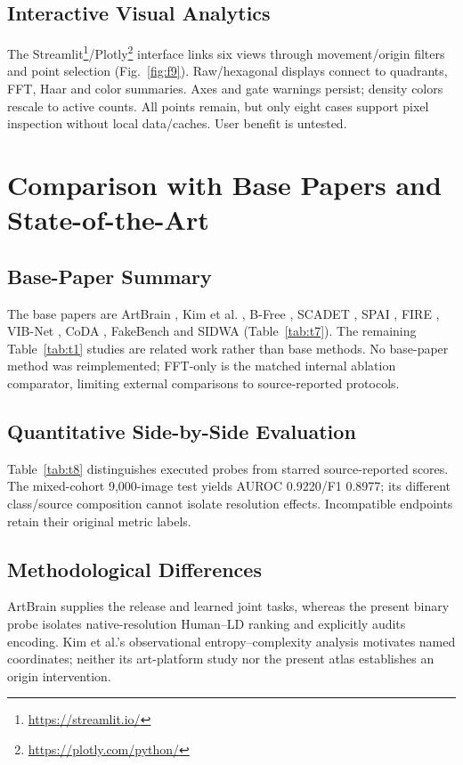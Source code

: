 \documentclass[journal,twoside,web]{IEEEtran}
\begin{document}
\subsection{Interactive Visual Analytics}

The Streamlit\footnote{\url{https://streamlit.io/}}/Plotly\footnote{\url{https://plotly.com/python/}} interface links six views through movement/origin filters and point selection (Fig.~\ref{fig:f9}). Raw/hexagonal displays connect to quadrants, FFT, Haar and color summaries. Axes and gate warnings persist; density colors rescale to active counts. All points remain, but only eight cases support pixel inspection without local data/caches. User benefit is untested.


\section{Comparison with Base Papers and State-of-the-Art}
\subsection{Base-Paper Summary}
The base papers are ArtBrain \cite{p1}, Kim et al. \cite{p2}, B-Free \cite{p3}, SCADET \cite{p4}, SPAI \cite{p5}, FIRE \cite{p6}, VIB-Net \cite{p7}, CoDA \cite{p8}, FakeBench \cite{p12} and SIDWA \cite{p14} (Table~\ref{tab:t7}). The remaining Table~\ref{tab:t1} studies are related work rather than base methods. No base-paper method was reimplemented; FFT-only is the matched internal ablation comparator, limiting external comparisons to source-reported protocols.


\subsection{Quantitative Side-by-Side Evaluation}
Table~\ref{tab:t8} distinguishes executed probes from starred source-reported scores. The mixed-cohort 9,000-image test yields AUROC 0.9220/F1 0.8977; its different class/source composition cannot isolate resolution effects. Incompatible endpoints retain their original metric labels.

\subsection{Methodological Differences}
ArtBrain supplies the release and learned joint tasks, whereas the present binary probe isolates native-resolution Human--LD ranking and explicitly audits encoding. Kim et al.'s observational entropy--complexity analysis motivates named coordinates; neither its art-platform study nor the present atlas establishes an origin intervention.
\end{document}
